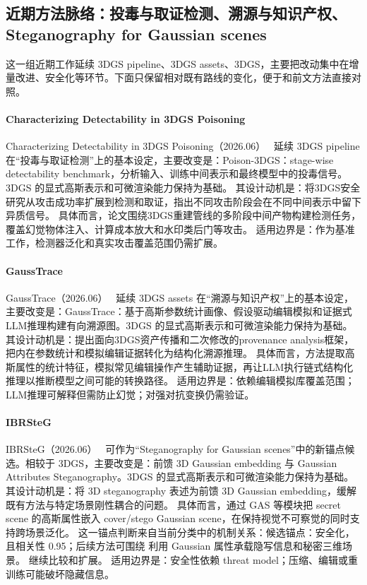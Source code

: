 \subsection{近期方法脉络：投毒与取证检测、溯源与知识产权、Steganography for Gaussian scenes}

这一组近期工作延续 3DGS pipeline、3DGS assets、3DGS，主要把改动集中在增量改进、安全化等环节。下面只保留相对既有路线的变化，便于和前文方法直接对照。

\paragraph{Characterizing Detectability in 3DGS Poisoning}
Characterizing Detectability in 3DGS Poisoning（2026.06）~\cite{2606_03499} 延续 3DGS pipeline 在“投毒与取证检测”上的基本设定，主要改变是：Poison-3DGS：stage-wise detectability benchmark，分析输入、训练中间表示和最终模型中的投毒信号。3DGS 的显式高斯表示和可微渲染能力保持为基础。
其设计动机是：将3DGS安全研究从攻击成功率扩展到检测和取证，指出不同攻击阶段会在不同中间表示中留下异质信号。
具体而言，论文围绕3DGS重建管线的多阶段中间产物构建检测任务，覆盖幻觉物体注入、计算成本放大和水印类后门等攻击。
适用边界是：作为基准工作，检测器泛化和真实攻击覆盖范围仍需扩展。

\paragraph{GaussTrace}
GaussTrace（2026.06）~\cite{2606_10612} 延续 3DGS assets 在“溯源与知识产权”上的基本设定，主要改变是：GaussTrace：基于高斯参数统计画像、假设驱动编辑模拟和证据式LLM推理构建有向溯源图。3DGS 的显式高斯表示和可微渲染能力保持为基础。
其设计动机是：提出面向3DGS资产传播和二次修改的provenance analysis框架，把内在参数统计和模拟编辑证据转化为结构化溯源推理。
具体而言，方法提取高斯属性的统计特征，模拟常见编辑操作产生辅助证据，再让LLM执行链式结构化推理以推断模型之间可能的转换路径。
适用边界是：依赖编辑模拟库覆盖范围；LLM推理可解释但需防止幻觉；对强对抗变换仍需验证。

\paragraph{IBRSteG}
IBRSteG（2026.06）~\cite{2606_30024} 可作为“Steganography for Gaussian scenes”中的新锚点候选。相较于 3DGS，主要改变是：前馈 3D Gaussian embedding 与 Gaussian Attributes Steganography。3DGS 的显式高斯表示和可微渲染能力保持为基础。
其设计动机是：将 3D steganography 表述为前馈 3D Gaussian embedding，缓解既有方法与特定场景刚性耦合的问题。
具体而言，通过 GAS 等模块把 secret scene 的高斯属性嵌入 cover/stego Gaussian scene，在保持视觉不可察觉的同时支持跨场景泛化。
这一锚点判断来自当前分类中的机制关系：候选锚点：安全化，且相关性 0.95；后续方法可围绕 利用 Gaussian 属性承载隐写信息和秘密三维场景。 继续比较和扩展。
适用边界是：安全性依赖 threat model；压缩、编辑或重训练可能破坏隐藏信息。
